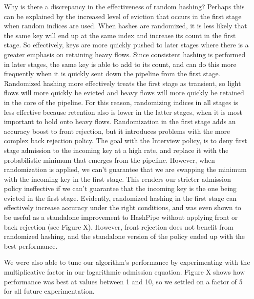 Why is there a discrepancy in the effectiveness of random hashing? Perhaps this can be explained by the increased level of eviction that occurs in the first stage when random indices are used. When hashes are randomized, it is less likely that the same key will end up at the same index and increase its count in the first stage. So effectively, keys are more quickly pushed to later stages where there is a greater emphasis on retaining heavy flows. Since consistent hashing is performed in later stages, the same key is able to add to its count, and can do this more frequently when it is quickly sent down the pipeline from the first stage. Randomized hashing more effectively treats the first stage as transient, so light flows will more quickly be evicted and heavy flows will more quickly be retained in the core of the pipeline. For this reason, randomizing indices in all stages is less effective because retention also is lower in the latter stages, when it is most important to hold onto heavy flows. Randomization in the first stage adds an accuracy boost to front rejection, but it introduces problems with the more complex back rejection policy. The goal with the Interview policy, is to deny first stage admission to the incoming key at a high rate, and replace it with the probabilistic minimum that emerges from the pipeline. However, when randomization is applied, we can't guarantee that we are swapping the minimum with the incoming key in the first stage. This renders our stricter admission policy ineffective if we can't guarantee that the incoming key is the one being evicted in the first stage. Evidently, randomized hashing  in the first stage can effectively increase accuracy under the right conditions, and was even shown to be useful as a standalone improvement to HashPipe without applying front or back rejection (see Figure X). However, front rejection does not benefit from randomized hashing, and the standalone version of the policy ended up with the best performance.

We were also able to tune our algorithm's performance by experimenting with the multiplicative factor in our logarithmic admission equation. Figure X shows how performance was best at values between 1 and 10, so we settled on a factor of 5 for all future experimentation.




